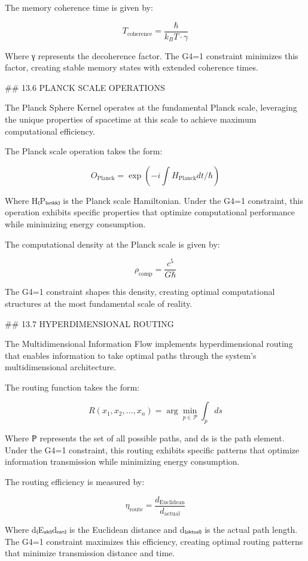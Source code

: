 The memory coherence time is given by:

$$T_{\text{coherence}} = \frac{\hbar}{k_B T \cdot \gamma}$$

Where γ represents the decoherence factor. The G4=1 constraint minimizes this factor, creating stable memory states with extended coherence times.

## 13.6 PLANCK SCALE OPERATIONS

The Planck Sphere Kernel operates at the fundamental Planck scale, leveraging the unique properties of spacetime at this scale to achieve maximum computational efficiency.

The Planck scale operation takes the form:

$$O_{\text{Planck}} = \exp\left(-i \int H_{\text{Planck}} dt / \hbar\right)$$

Where H₍Pₗₐₙₖₖ₎ is the Planck scale Hamiltonian. Under the G4=1 constraint, this operation exhibits specific properties that optimize computational performance while minimizing energy consumption.

The computational density at the Planck scale is given by:

$$\rho_{\text{comp}} = \frac{c^5}{G \hbar}$$

The G4=1 constraint shapes this density, creating optimal computational structures at the most fundamental scale of reality.

## 13.7 HYPERDIMENSIONAL ROUTING

The Multidimensional Information Flow implements hyperdimensional routing that enables information to take optimal paths through the system's multidimensional architecture.

The routing function takes the form:

$$R(x_1, x_2, ..., x_n) = \arg\min_{p \in \mathcal{P}} \int_p ds$$

Where ℙ represents the set of all possible paths, and ds is the path element. Under the G4=1 constraint, this routing exhibits specific patterns that optimize information transmission while minimizing energy consumption.

The routing efficiency is measured by:

$$\eta_{\text{route}} = \frac{d_{\text{Euclidean}}}{d_{\text{actual}}}$$

Where d₍Eᵤₖₗᵢdₑₐₙ₎ is the Euclidean distance and d₍ₐₖₜᵤₐₗ₎ is the actual path length. The G4=1 constraint maximizes this efficiency, creating optimal routing patterns that minimize transmission distance and time.

